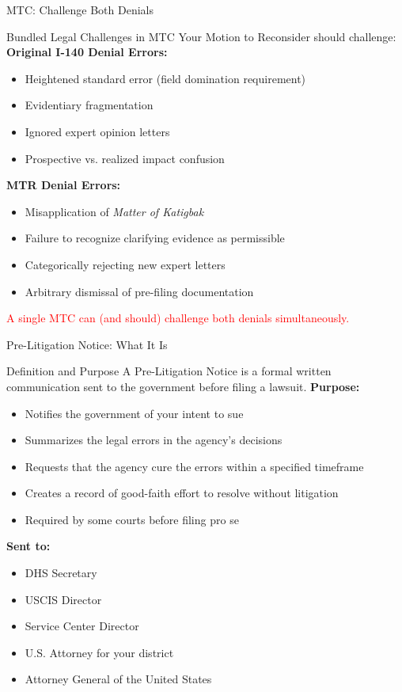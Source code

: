 \documentclass[11pt]{beamer}
\begin{document}
	\begin{frame}{MTC: Challenge Both Denials}
		\scriptsize
		\begin{block}{Bundled Legal Challenges in MTC}
			Your Motion to Reconsider should challenge:
			\vspace{0.2cm}
			\textbf{Original I-140 Denial Errors:}
			\begin{itemize}
				\item Heightened standard error (field domination requirement)
				\item Evidentiary fragmentation
				\item Ignored expert opinion letters
				\item Prospective vs. realized impact confusion
			\end{itemize}
			\textbf{MTR Denial Errors:}
			\begin{itemize}
				\item Misapplication of \textit{Matter of Katigbak}
				\item Failure to recognize clarifying evidence as permissible
				\item Categorically rejecting new expert letters
				\item Arbitrary dismissal of pre-filing documentation
			\end{itemize}
			\textcolor{red}{A single MTC can (and should) challenge both denials simultaneously.}
		\end{block}
	\end{frame}
	
	\begin{frame}{Pre-Litigation Notice: What It Is}
		\scriptsize
		\begin{block}{Definition and Purpose}
			A Pre-Litigation Notice is a formal written communication sent to the government before filing a lawsuit.
			\vspace{0.2cm}
			\textbf{Purpose:}
			\begin{itemize}
				\item Notifies the government of your intent to sue
				\item Summarizes the legal errors in the agency's decisions
				\item Requests that the agency cure the errors within a specified timeframe
				\item Creates a record of good-faith effort to resolve without litigation
				\item Required by some courts before filing pro se
			\end{itemize}
			\textbf{Sent to:}
			\begin{itemize}
				\item DHS Secretary
				\item USCIS Director
				\item Service Center Director
				\item U.S. Attorney for your district
				\item Attorney General of the United States
			\end{itemize}
		\end{block}
	\end{frame}
	
\end{document}
